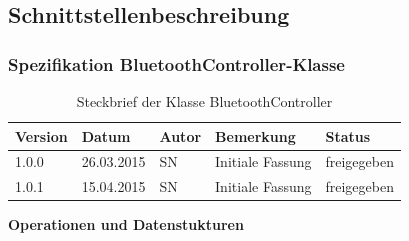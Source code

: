 \subsection{Schnittstellenbeschreibung}
\subsubsection{Spezifikation BluetoothController-Klasse}

\begin{table}[h!]
\begin{tabular}{|l|l|l|l|l|}
\hline 
Version & Datum & Autor & Bemerkung & Status \\ 
\hline 
1.0.0 & 26.03.2015 & SN & Initiale Fassung & freigegeben \\ 
\hline 
1.0.1 & 15.04.2015 & SN & Initiale Fassung & freigegeben \\ 
\hline 
\end{tabular} 
\caption{Steckbrief der Klasse BluetoothController}
\end{table}

\textbf{Operationen und Datenstukturen}
 
